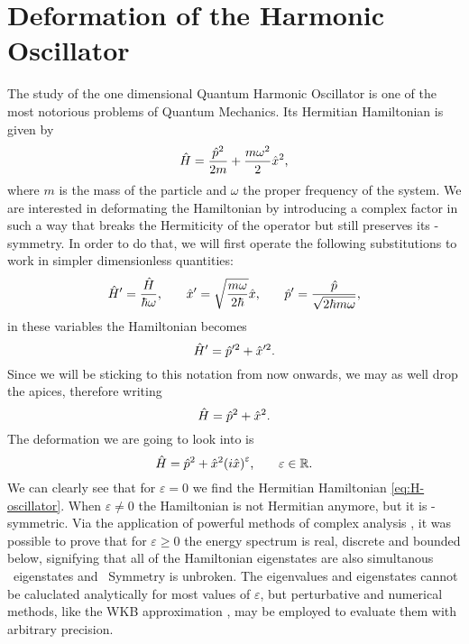         \section{Deformation of the Harmonic Oscillator}\label{s:deformed-harmonic-oscillator}
            The study of the one dimensional Quantum Harmonic Oscillator is one of the most notorious problems of Quantum Mechanics. Its Hermitian Hamiltonian is given by
            \begin{equation}
                \hat{H} = \frac{\hat{p}^2}{2m} + \frac{m\omega^2}{2}\hat{x}^2\text{,}
            \end{equation}
            where $m$ is the mass of the particle and $\omega$ the proper frequency of the system. We are interested in deformating the Hamiltonian by introducing a complex factor in such a way that breaks the Hermiticity of the operator but still preserves its \PT-symmetry. In order to do that, we will first operate the following substitutions to work in simpler dimensionless quantities:
            \begin{equation}
                \hat{H}' = \frac{\hat{H}}{\hbar\omega}
                \text{,}\qquad
                \hat{x}' = \sqrt{\frac{m\omega}{2\hbar}}\hat{x}
                \text{,}\qquad
                \hat{p}' = \frac{\hat{p}}{\sqrt{2 \hbar m \omega}}
                \text{,}
            \end{equation}
            in these variables the Hamiltonian becomes
            \begin{equation*}
                \hat{H}' = \hat{p}'^2 + \hat{x}'^2
                \text{.}
            \end{equation*}
            Since we will be sticking to this notation from now onwards, we may as well drop the apices, therefore writing
            \begin{equation}
                \label{eq:H-oscillator}
                \hat{H} = \hat{p}^2 + \hat{x}^2
                \text{.}
            \end{equation}
            The deformation we are going to look into is
            \begin{equation}
                \hH = \hp^2 + \hx^2\pqty{i\hx}^\varepsilon
                \mycomma\qquad
                \varepsilon \in \bbR
                \myperiod
            \end{equation}
            We can clearly see that for $\varepsilon = 0$ we find the Hermitian Hamiltonian \eqref{eq:H-oscillator}. When $\varepsilon \neq 0$ the Hamiltonian is not Hermitian anymore, but it is \PT-symmetric. Via the application of powerful methods of complex analysis \cite{bender2024,Bender1998}, it was possible to prove that for $\varepsilon \geq 0$ the energy spectrum is real, discrete and bounded below, signifying that all of the Hamiltonian eigenstates are also simultanous \hPT\ eigenstates and \PT\ Symmetry is unbroken. The eigenvalues and eigenstates cannot be caluclated analytically for most values of $\varepsilon$, but perturbative and numerical methods, like the WKB approximation \cite{Bender2007}, may be employed to evaluate them with arbitrary precision.

